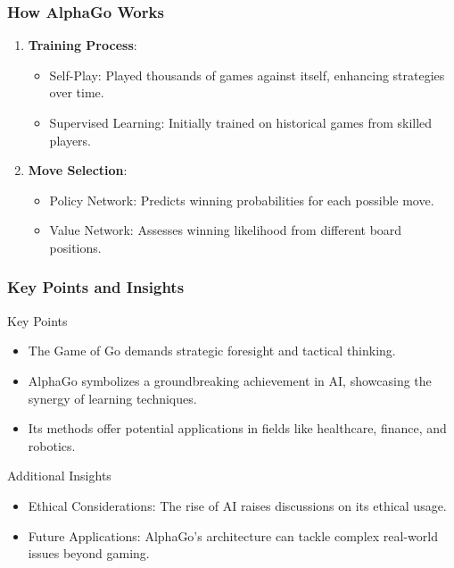 \documentclass[aspectratio=169]{beamer}
\begin{document}
\begin{frame}[fragile]
    \frametitle{How AlphaGo Works}
    \begin{enumerate}
        \item \textbf{Training Process}:
            \begin{itemize}
                \item Self-Play: Played thousands of games against itself, enhancing strategies over time.
                \item Supervised Learning: Initially trained on historical games from skilled players.
            \end{itemize}
        \item \textbf{Move Selection}:
            \begin{itemize}
                \item Policy Network: Predicts winning probabilities for each possible move.
                \item Value Network: Assesses winning likelihood from different board positions.
            \end{itemize}
    \end{enumerate}
\end{frame}

\begin{frame}[fragile]
    \frametitle{Key Points and Insights}
    \begin{block}{Key Points}
        \begin{itemize}
            \item The Game of Go demands strategic foresight and tactical thinking.
            \item AlphaGo symbolizes a groundbreaking achievement in AI, showcasing the synergy of learning techniques.
            \item Its methods offer potential applications in fields like healthcare, finance, and robotics.
        \end{itemize}
    \end{block}
    \begin{block}{Additional Insights}
        \begin{itemize}
            \item Ethical Considerations: The rise of AI raises discussions on its ethical usage.
            \item Future Applications: AlphaGo's architecture can tackle complex real-world issues beyond gaming.
        \end{itemize}
    \end{block}
\end{frame}
\end{document}
